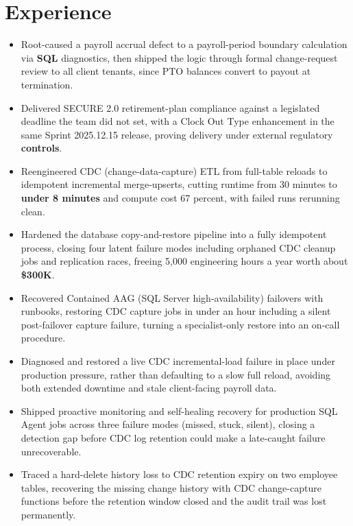 \documentclass[letterpaper,10pt]{article}
\begin{document}
\section{Experience}
\begin{itemize}
\item Root-caused a payroll accrual defect to a payroll-period boundary calculation via \textbf{SQL} diagnostics, then shipped the logic through formal change-request review to all client tenants, since PTO balances convert to payout at termination.
\item Delivered SECURE 2.0 retirement-plan compliance against a legislated deadline the team did not set, with a Clock Out Type enhancement in the same Sprint 2025.12.15 release, proving delivery under external regulatory \textbf{controls}.
\item Reengineered CDC (change-data-capture) ETL from full-table reloads to idempotent incremental merge-upserts, cutting runtime from 30 minutes to \textbf{under 8 minutes} and compute cost 67 percent, with failed runs rerunning clean.
\item Hardened the database copy-and-restore pipeline into a fully idempotent process, closing four latent failure modes including orphaned CDC cleanup jobs and replication races, freeing 5,000 engineering hours a year worth about \textbf{\$300K}.
\item Recovered Contained AAG (SQL Server high-availability) failovers with runbooks, restoring CDC capture jobs in under an hour including a silent post-failover capture failure, turning a specialist-only restore into an on-call procedure.
\item Diagnosed and restored a live CDC incremental-load failure in place under production pressure, rather than defaulting to a slow full reload, avoiding both extended downtime and stale client-facing payroll data.
\item Shipped proactive monitoring and self-healing recovery for production SQL Agent jobs across three failure modes (missed, stuck, silent), closing a detection gap before CDC log retention could make a late-caught failure unrecoverable.
\item Traced a hard-delete history loss to CDC retention expiry on two employee tables, recovering the missing change history with CDC change-capture functions before the retention window closed and the audit trail was lost permanently.
\end{itemize}
\end{document}
